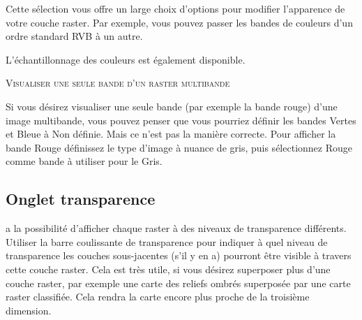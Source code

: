 
Cette sélection vous offre un large choix d'options pour modifier l'apparence de votre couche raster. Par exemple, vous pouvez passer les bandes de couleurs d'un ordre standard RVB à un autre.

L'échantillonnage des couleurs est également disponible.

\begin{Tip}\caption{\textsc{Visualiser une seule bande d'un raster multibande}}
Si vous désirez visualiser une seule bande (par exemple la bande rouge)
d'une image multibande, vous pouvez penser que vous pourriez définir les bandes Vertes et Bleue à Non définie. Mais ce n'est pas la manière correcte. Pour afficher la bande Rouge définissez le type d'image à nuance de gris, puis sélectionnez Rouge comme bande à utiliser pour le Gris.
\end{Tip} 

\subsection{Onglet transparence} \label{rastertab:transparency}

\qg a la possibilité d'afficher chaque raster à des niveaux de transparence
différents. Utiliser la barre coulissante de transparence pour indiquer à quel niveau de transparence les couches sous-jacentes (s'il y en a) pourront être visible à travers cette couche raster. Cela est très utile, si vous désirez superposer plus d'une couche raster, par exemple une carte des reliefs ombrés superposée par une carte raster classifiée. Cela rendra la carte encore plus proche de la troisième dimension.

